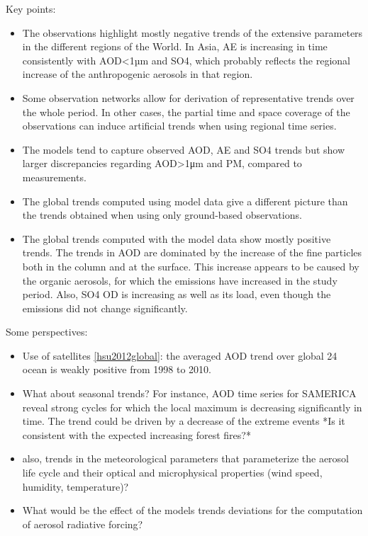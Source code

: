 \documentclass[journal abbreviation, manuscript]{copernicus}
\begin{document}
Key points:
\begin{itemize}
 \item The observations highlight mostly negative trends of the extensive parameters in the different regions of the World. In Asia, AE is increasing in time consistently with AOD<1µm and SO4, which probably reflects the regional increase of the anthropogenic aerosols in that region.
 \item Some observation networks allow for derivation of representative trends over the whole period. In other cases, the partial time and space coverage of the observations can induce artificial trends when using regional time series.
 \item The models tend to capture observed AOD, AE and SO4 trends but show larger discrepancies regarding AOD>1μm and PM, compared to measurements.
 \item The global trends computed using model data give a different picture than the trends obtained when using only ground-based observations.
 \item The global trends computed with the model data show mostly positive trends. The trends in AOD are dominated by the increase of the fine particles both in the column and at the surface. This increase appears to be caused by the organic aerosols, for which the emissions have increased in the study period. Also, SO4 OD is increasing as well as its load, even though the emissions did not change significantly.
\end{itemize}

Some perspectives:
\begin{itemize}
 \item  Use of satellites \ref{hsu2012global}:  the averaged AOD trend over global
24 ocean is weakly positive from 1998 to 2010.
 \item What about seasonal trends? For instance, AOD time series for SAMERICA reveal strong cycles for which the local maximum is decreasing significantly in time. The trend could be driven by a decrease of the extreme events *Is it consistent with the expected increasing forest fires?*
 \item also, trends in the meteorological parameters that parameterize the aerosol life cycle and their optical and microphysical properties (wind speed, humidity, temperature)?
 \item What would be the effect of the models trends deviations for the computation of aerosol radiative forcing? \cite{streets2006two,norris2007trends}
\end{itemize}
\end{document}
